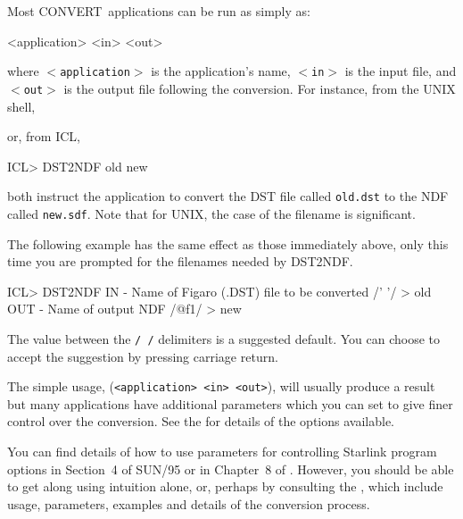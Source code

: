 \documentclass[twoside,11pt]{starlink}
\providecommand{\latexelsehtml}[2]{#1}
\providecommand{\CONVERT}{{\footnotesize CONVERT}}
\begin{document}
Most \CONVERT\ applications can be run as simply as:


\begin{terminalv}
     <application> <in> <out>
\end{terminalv}

where \texttt{$<$application$>$} is the application's name, \texttt{$<$in$>$}
is the input file, and \texttt{$<$out$>$} is the output
file following the conversion.  For instance, from the UNIX shell,


\begin{terminalv}
\end{terminalv}

or, from ICL,


\begin{terminalv}
     ICL> DST2NDF old new
\end{terminalv}

both instruct the application  to convert the
DST file called \texttt{old.dst} to the NDF called \texttt{new.sdf}.
Note that for UNIX, the case of the filename is significant.

The following example has the same effect as those immediately above,
only this time you are prompted for the filenames needed by DST2NDF.


\begin{terminalv}
     ICL> DST2NDF
     IN - Name of Figaro (.DST) file to be converted /' '/ > old
     OUT - Name of output NDF /@f1/ > new
\end{terminalv}

The value between the \texttt{/ /} delimiters is a suggested default.  You
can choose to accept the suggestion by pressing carriage return.

The simple usage, (\texttt{<application> <in> <out>}), will usually produce a
result but many applications have additional parameters which you can set to
give finer control over the conversion. See the
 for details of the options available.

You can find details of how to use parameters for controlling Starlink program
options
\latexelsehtml{in Section~4 of SUN/95}{\xref{in SUN/95}{sun95}{se_param}}
or in
\latexelsehtml{Chapter~8}{section `Specifying Parameter Values'}
of
.
However, you should be able to get along using intuition alone, or, perhaps
by consulting the
, which include usage, parameters,
examples and details of the conversion process.
\end{document}
